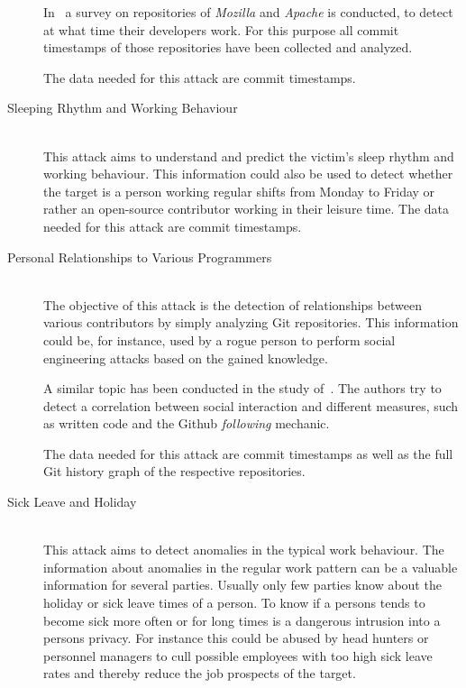 \begin{description}
        In~\cite{article:do-programmers-work-at-night} a survey on repositories of \emph{Mozilla} and \emph{Apache} is conducted, to detect at what time their developers work.
        For this purpose all commit timestamps of those repositories have been collected and analyzed.

        The data needed for this attack are commit timestamps.

    \item[Sleeping Rhythm and Working Behaviour] \hfill \\
        This attack aims to understand and predict the victim's sleep rhythm and working behaviour.
        This information could also be used to detect whether the target is a person working regular shifts from Monday to Friday or rather an open-source contributor working in their leisure time.
        The data needed for this attack are commit timestamps.

    \item[Personal Relationships to Various Programmers] \hfill \\
        The objective of this attack is the detection of relationships between various contributors by simply analyzing Git repositories.
        This information could be, for instance, used by a rogue person to perform social engineering attacks based on the gained knowledge.

        A similar topic has been conducted in the study of~\cite{inproceedings:exploring-the-ecosystem}.
        The authors try to detect a correlation between social interaction and different measures, such as written code and the Github \emph{following} mechanic.

        The data needed for this attack are commit timestamps as well as the full Git history graph of the respective repositories.

    \item[Sick Leave and Holiday] \hfill \\
        This attack aims to detect anomalies in the typical work behaviour.
        The information about anomalies in the regular work pattern can be a valuable information for several parties.
        Usually only few parties know about the holiday or sick leave times of a person.
        To know if a persons tends to become sick more often or for long times is a dangerous intrusion into a persons privacy.
        For instance this could be abused by head hunters or personnel managers to cull possible employees with too high sick leave rates and thereby reduce the job prospects of the target.


\end{description}
